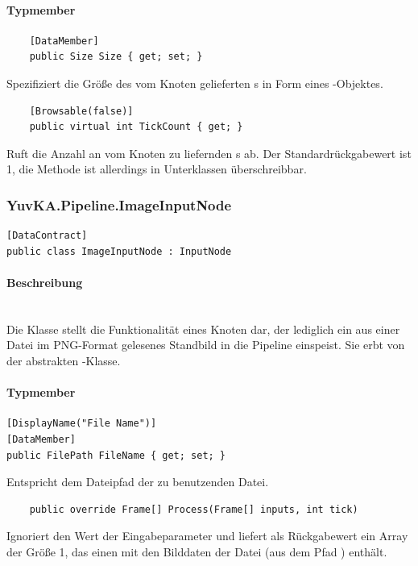 \paragraph{Typmember}
\begin{itemize}

	\begin{verbatim}
	[DataMember]
	public Size Size { get; set; }
	\end{verbatim}
	Spezifiziert die Größe des vom Knoten gelieferten s in Form eines -Objektes.

	\begin{verbatim}
	[Browsable(false)]
	public virtual int TickCount { get; }
	\end{verbatim}
	Ruft die Anzahl an vom Knoten zu liefernden s ab. Der Standardrückgabewert ist 1, die Methode ist allerdings in Unterklassen überschreibbar.

\end{itemize}

\subsubsection{YuvKA.Pipeline.ImageInputNode}

\begin{verbatim}
[DataContract]
public class ImageInputNode : InputNode
\end{verbatim}

\paragraph{Beschreibung}~\\
Die Klasse  stellt die Funktionalität eines Knoten dar, der lediglich ein aus einer Datei im PNG-Format gelesenes Standbild in die Pipeline einspeist. Sie erbt von der abstrakten -Klasse.

\paragraph{Typmember}
\begin{itemize}

	\begin{verbatim}
[DisplayName("File Name")]
[DataMember]
public FilePath FileName { get; set; }
	\end{verbatim}
	Entspricht dem Dateipfad der zu benutzenden Datei.

	\begin{verbatim}
	public override Frame[] Process(Frame[] inputs, int tick)
	\end{verbatim}
	Ignoriert den Wert der Eingabeparameter und liefert als Rückgabewert ein Array der Größe 1, das einen  mit den Bilddaten der Datei (aus dem Pfad ) enthält.

\end{itemize}
